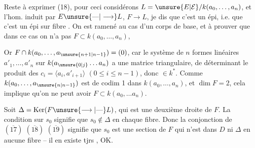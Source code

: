 
Reste à exprimer  (18), pour ceci considérons  $L=\unsure{E|\mathcal E}/k(a_0,\ldots,a_n)$, et l'hom. induit par $E\unsure{\text{---}|\longrightarrow}L$, $F\longrightarrow L$,  je dis que c'est un épi, i.e. que c'est un épi sur  fibre . On est ramené au cas d'un corps de base, et à prouver que dans ce cas on n'a pas $F\subset k(a_0,\ldots,a_n)$, 

Or $F\cap k(a_0,\ldots,a_{\unsure{n+1|n-1}})=(0)$, car le système de $n$ formes linéaires $a'_1,\ldots,a'_n$ sur $k(a_{\unsure{0|j}}\ldots a_n)$ a une matrice triangulaire, de déterminant le produit des $c_i=\langle a_i,a'_{i+1}\rangle$ $(0\leq i\leq n-1)$, donc $\in k^*$. Comme $k(a_0,\ldots,a_{\unsure{n|n-1}})$ est de codim 1 dans $k(a_0,\ldots,a_n)$,  et $\dim F=2$, cela implique qu'on ne peut avoir $F\subset k(a_0,\ldots a_n)$.

Soit  $\Delta=\operatorname{Ker}(F\unsure{\longrightarrow|\text{---}}L)$, qui est une deuxième droite de $F$. La condition  sur $s_0$ signifie que $s_0\notin\Delta$ en chaque fibre. Donc la conjonction de $(\overline{17})$ $(\overline{18})$ $(\overline{19})$ signifie que $s_0$ est une section de $F$  qui n'est dans $D$ ni $\Delta$ en aucune fibre -- il en existe tjrs , OK.

